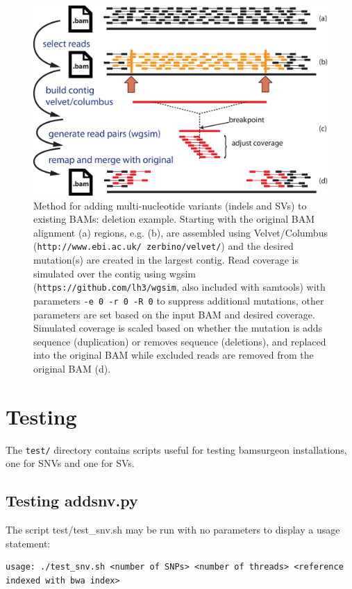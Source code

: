 \documentclass[letterpaper,11pt]{article}
\begin{document}
\begin{figure}[!h]
\centering
\includegraphics[width=5.5in]{bamsurgeon_sv_del.eps}
\caption{Method for adding multi-nucleotide variants (indels and SVs) to existing BAMs: deletion example. Starting with the original BAM alignment (a) regions, e.g. (b), are assembled using Velvet/Columbus (\texttt{http://www.ebi.ac.uk/~zerbino/velvet/}) and the desired mutation(s) are created in the largest contig. Read coverage is simulated over the contig using wgsim (\texttt{https://github.com/lh3/wgsim}, also included with samtools) with parameters \texttt{-e 0 -r 0 -R 0} to suppress additional mutations, other parameters are set based on the input BAM and desired coverage. Simulated coverage is scaled based on whether the mutation is adds sequence (duplication) or removes sequence (deletions), and replaced into the original BAM while excluded reads are removed from the original BAM (d).}
\end{figure}

\section{Testing}
The \texttt{test/} directory contains scripts useful for testing bamsurgeon installations, one for SNVs and one for SVs.
\subsection{Testing addsnv.py}
The script {test/test\_snv.sh} may be run with no parameters to display a usage statement:
\begin{verbatim}
usage: ./test_snv.sh <number of SNPs> <number of threads> <reference indexed with bwa index>
\end{verbatim}
\end{document}
